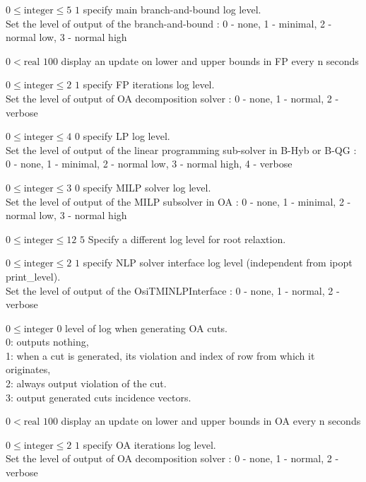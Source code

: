 %
{$0\leq\textrm{integer}\leq5$}%
{$1$}%
{specify main branch-and-bound log level.\\
Set the level of output of the branch-and-bound : 0 - none, 1 - minimal, 2 - normal low, 3 - normal high}%
{}

%
{$0<\textrm{real}$}%
{$100$}%
{display an update on lower and upper bounds in FP every n seconds}%
{}

%
{$0\leq\textrm{integer}\leq2$}%
{$1$}%
{specify FP iterations log level.\\
Set the level of output of OA decomposition solver : 0 - none, 1 - normal, 2 - verbose}%
{}

%
{$0\leq\textrm{integer}\leq4$}%
{$0$}%
{specify LP log level.\\
Set the level of output of the linear programming sub-solver in B-Hyb or B-QG : 0 - none, 1 - minimal, 2 - normal low, 3 - normal high, 4 - verbose}%
{}

%
{$0\leq\textrm{integer}\leq3$}%
{$0$}%
{specify MILP solver log level.\\
Set the level of output of the MILP subsolver in OA : 0 - none, 1 - minimal, 2 - normal low, 3 - normal high}%
{}

%
{$0\leq\textrm{integer}\leq12$}%
{$5$}%
{ Specify a different log level for root relaxtion.}%
{}

%
{$0\leq\textrm{integer}\leq2$}%
{$1$}%
{specify NLP solver interface log level (independent from ipopt print\_level).\\
Set the level of output of the OsiTMINLPInterface : 0 - none, 1 - normal, 2 - verbose}%
{}

%
{$0\leq\textrm{integer}$}%
{$0$}%
{level of log when generating OA cuts.\\
0: outputs nothing,\\1: when a cut is generated, its violation and index of row from which it originates,\\2: always output violation of the cut.\\3: output generated cuts incidence vectors.}%
{}

%
{$0<\textrm{real}$}%
{$100$}%
{display an update on lower and upper bounds in OA every n seconds}%
{}

%
{$0\leq\textrm{integer}\leq2$}%
{$1$}%
{specify OA iterations log level.\\
Set the level of output of OA decomposition solver : 0 - none, 1 - normal, 2 - verbose}%
{}

